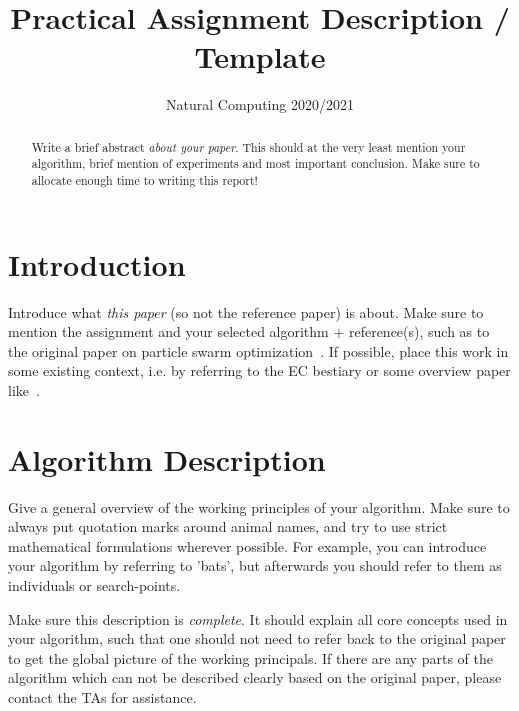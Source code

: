\documentclass[runningheads]{llncs}
\begin{document}
%
\title{Practical Assignment Description / Template}
%
%
\author{Natural Computing 2020/2021}
%
%
%
\maketitle              %
%
\begin{abstract}
Write a brief abstract \emph{about your paper}. This should at the very least mention your algorithm, brief mention of experiments and most important conclusion. Make sure to allocate enough time to writing this report!
\end{abstract}


\section{Introduction}
Introduce what \emph{this paper} (so not the reference paper) is about. Make sure to mention the assignment and your selected algorithm + reference(s), such as to the original paper on particle swarm optimization~\cite{eberhart1995particle}. If possible, place this work in some existing context, i.e. by referring to the EC bestiary or some overview paper like~\cite{Sorensen15}.

\section{Algorithm Description} \label{sec:description}
Give a general overview of the working principles of your algorithm. Make sure to always put quotation marks around animal names, and try to use strict mathematical formulations wherever possible. For example, you can introduce your algorithm by referring to 'bats', but afterwards you should refer to them as individuals or search-points. 

Make sure this description is \emph{complete}. It should explain all core concepts used in your algorithm, such that one should not need to refer back to the original paper to get the global picture of the working principals. If there are any parts of the algorithm which can not be described clearly based on the original paper, please contact the TAs for assistance.
\end{document}
